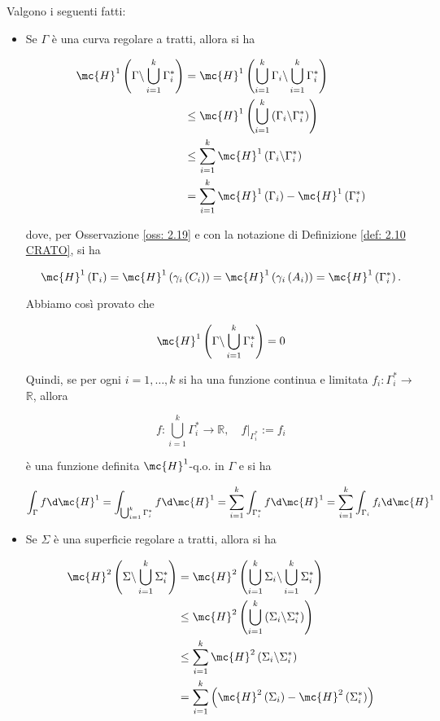 \begin{oss}\label{oss: 2.21}
    Valgono i seguenti fatti:

\begin{itemize}
  \item Se $\Gamma$ è una curva regolare a tratti, allora si ha

\[
\begin{aligned}
\mc{H}^{1}\left(\Gamma \backslash \bigcup_{i=1}^{k} \Gamma_{i}^{*}\right) & =\mc{H}^{1}\left(\bigcup_{i=1}^{k} \Gamma_{i} \backslash \bigcup_{i=1}^{k} \Gamma_{i}^{*}\right) \\
& \leq \mc{H}^{1}\left(\bigcup_{i=1}^{k}\left(\Gamma_{i} \backslash \Gamma_{i}^{*}\right)\right) \\
& \leq \sum_{i=1}^{k} \mc{H}^{1}\left(\Gamma_{i} \backslash \Gamma_{i}^{*}\right) \\
& =\sum_{i=1}^{k} \mc{H}^{1}\left(\Gamma_{i}\right)-\mc{H}^{1}\left(\Gamma_{i}^{*}\right)
\end{aligned}
\]

dove, per Osservazione \ref{oss: 2.19} e con la notazione di Definizione \ref{def: 2.10 CRATO}, si ha

\[
\mc{H}^{1}\left(\Gamma_{i}\right)=\mc{H}^{1}\left(\gamma_{i}\left(C_{i}\right)\right)=\mc{H}^{1}\left(\gamma_{i}\left(A_{i}\right)\right)=\mc{H}^{1}\left(\Gamma_{i}^{*}\right) .
\]

Abbiamo così provato che

\[
\mc{H}^{1}\left(\Gamma \backslash \bigcup_{i=1}^{k} \Gamma_{i}^{*}\right)=0
\]

Quindi, se per ogni $i=1, \ldots, k$ si ha una funzione continua e limitata $f_{i}: \Gamma_{i}^{*} \rightarrow$ $\mathbb{R}$, allora

\[
f: \bigcup_{i=1}^{k} \Gamma_{i}^{*} \rightarrow \mathbb{R},\left.\quad f\right|_{\Gamma_{i}^{*}}:=f_{i}
\]

è una funzione definita $\mc{H}^{1}$-q.o. in $\Gamma$ e si ha

\[
\int_{\Gamma} f \d \mc{H}^{1}=\int_{\bigcup_{i=1}^{k} \Gamma_{i}^{*}} f \d \mc{H}^{1}=\sum_{i=1}^{k} \int_{\Gamma_{i}^{*}} f \d \mc{H}^{1}=\sum_{i=1}^{k} \int_{\Gamma_{i}} f_{i} \d \mc{H}^{1}
\]

  \item Se $\Sigma$ è una superficie regolare a tratti, allora si ha

\[
\begin{aligned}
\mc{H}^{2}\left(\Sigma \backslash \bigcup_{i=1}^{k} \Sigma_{i}^{*}\right) & =\mc{H}^{2}\left(\bigcup_{i=1}^{k} \Sigma_{i} \backslash \bigcup_{i=1}^{k} \Sigma_{i}^{*}\right) \\
& \leq \mc{H}^{2}\left(\bigcup_{i=1}^{k}\left(\Sigma_{i} \backslash \Sigma_{i}^{*}\right)\right) \\
& \leq \sum_{i=1}^{k} \mc{H}^{2}\left(\Sigma_{i} \backslash \Sigma_{i}^{*}\right) \\
& =\sum_{i=1}^{k}\left(\mc{H}^{2}\left(\Sigma_{i}\right)-\mc{H}^{2}\left(\Sigma_{i}^{*}\right)\right)
\end{aligned}
\]


\end{itemize}
\end{oss}
